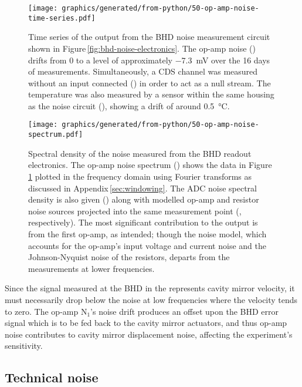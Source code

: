 \begin{figure}
  \centering
  \texttt{[image: graphics/generated/from-python/50-op-amp-noise-time-series.pdf]}
  \caption[Time series of the noise measured from the balanced homodyne readout electronics]{\label{fig:op-amp-noise-time-series}Time series of the output from the BHD noise measurement circuit shown in Figure\,\ref{fig:bhd-noise-electronics}. The op-amp noise () drifts from \num{0} to a level of approximately \SI{-7.3}{\milli\volt} over the 16 days of measurements. Simultaneously, a CDS channel was measured without an input connected () in order to act as a null stream. The temperature was also measured by a sensor within the same housing as the noise circuit (), showing a drift of around \SI{0.5}{\celsius}.}
\end{figure}

\begin{figure}
  \centering
  \texttt{[image: graphics/generated/from-python/50-op-amp-noise-spectrum.pdf]}
  \caption[Spectral density of the noise measured from the balanced homodyne readout electronics]{\label{fig:op-amp-noise-spectrum}Spectral density of the noise measured from the BHD readout electronics. The op-amp noise spectrum () shows the data in Figure\,\ref{fig:op-amp-noise-time-series} plotted in the frequency domain using Fourier transforms as discussed in Appendix\,\ref{sec:windowing}. The ADC noise spectral density is also given () along with modelled op-amp and resistor noise sources projected into the same measurement point (, respectively). The most significant contribution to the output is from the first op-amp, as intended; though the noise model, which accounts for the op-amp's input voltage and current noise and the Johnson-Nyquist noise of the resistors, departs from the measurements at lower frequencies.}
\end{figure}

Since the signal measured at the \gls{BHD} in the \SSMEXPT{} represents cavity mirror velocity, it must necessarily drop below the noise at low frequencies where the velocity tends to zero. The op-amp $\textrm{N}_{1}$'s noise drift produces an offset upon the \gls{BHD} error signal which is to be fed back to the cavity mirror actuators, and thus op-amp noise contributes to cavity mirror displacement noise, affecting the experiment's sensitivity.

\subsection{Technical noise}

